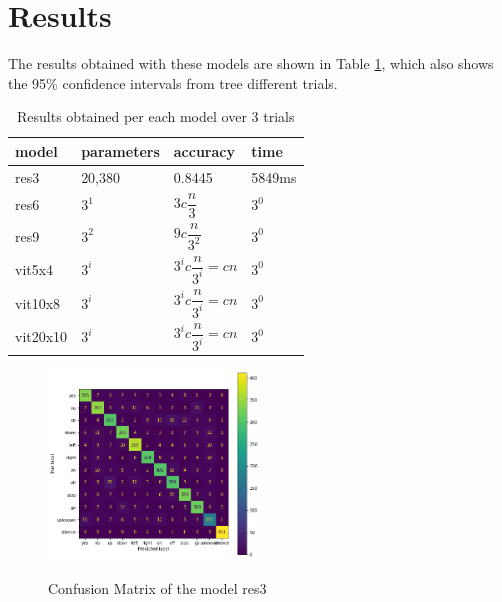 
\section{Results}
\label{sec:results}



The results obtained with these models are shown in Table \ref{table:results}, which also shows the 95\% confidence intervals from tree  different trials.

\begin{table}
	\centering
	\begin{tabular}{|l|l|l|l|}
    \hline
    model  & parameters & accuracy  & time \\
    \hline
    res3 & 20,380 & 0.8445 & 5849ms \\
    \hline
    res6 & $3^1$ & $3c\dfrac{n}{3}$ & $3^0$\\
    \hline
    res9 & $3^2$ & $9c\dfrac{n}{3^2}$ & $3^0$ \\
    \hline
    vit5x4 & $3^i$ & $3^ic\dfrac{n}{3^i}=cn$ & $3^0$  \\
    \hline
    vit10x8  & $3^i$ & $3^ic\dfrac{n}{3^i}=cn$ & $3^0$  \\
    \hline
    vit20x10  & $3^i$ & $3^ic\dfrac{n}{3^i}=cn$ & $3^0$  \\
    \hline
    \end{tabular} 
\label{table:results}
\caption{Results obtained per each model over 3 trials}
\end{table}


\begin{figure}[h]
    \centering
    \includegraphics[width=0.5\textwidth]{confusion_matrix_res3_keyword.png}
    \label{fig:confusionmatrix}
    \caption{Confusion Matrix of the model res3}
\end{figure}


